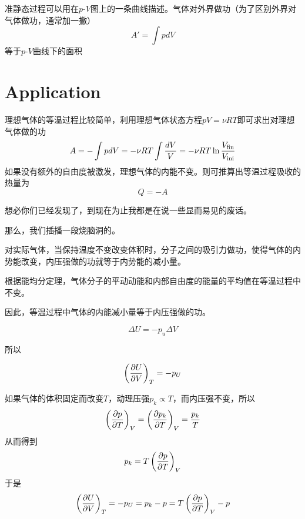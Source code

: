 \documentclass[CJK]{beamer}
\begin{document}
\begin{frame}
\bch
准静态过程可以用在$p$-$V$图上的一条曲线描述。气体对外界做功（为了区别外界对气体做功，通常加一撇）
$$ A' = \int p dV $$
等于$p$-$V$曲线下的面积

\ech
\end{frame}

\section{Application}

\begin{frame}
\bch
理想气体的等温过程比较简单，利用理想气体状态方程$pV = \nu RT$即可求出对理想气体做的功
$$ A = -\int p dV = -\nu R T \int \frac{dV}{V} =- \nu R T\ln\frac{V_{\rm fin}}{V_{\rm ini}}$$
如果没有额外的自由度被激发，理想气体的内能不变。则可推算出等温过程吸收的热量为
$$ Q = - A $$
\ech
\end{frame}

\begin{frame}
\bch

想必你们已经发现了，到现在为止我都是在说一些显而易见的废话\bye。

\ech
\end{frame}

\begin{frame}
\bch

那么，我们插播一段烧脑洞的。

\ech
\end{frame}


\begin{frame}
\bch
对实际气体，当保持温度不变改变体积时，分子之间的吸引力做功，使得气体的内势能改变，内压强做的功就等于内势能的减小量。

根据能均分定理，气体分子的平动动能和内部自由度的能量的平均值在等温过程中不变。

因此，等温过程中气体的内能减小量等于内压强做的功。

$$\Delta U = - p_u \Delta V$$

所以

$$\left(\frac{\partial U}{\partial V}\right)_{T} = - p_U  $$

\ech
\end{frame}

\begin{frame}
\bch
{\small
如果气体的体积固定而改变$T$，动理压强$p_k \propto T$，而内压强不变，所以
$$\left(\frac{\partial p}{\partial T}\right)_{V} = \left(\frac{\partial p_k}{\partial T}\right)_{V} = \frac{p_k}{T}$$
从而得到
$$p_k = T \left(\frac{\partial p}{\partial T}\right)_{V}$$
于是
$$\left(\frac{\partial U}{\partial V}\right)_{T} = -p_U = p_k - p = T \left(\frac{\partial p}{\partial T}\right)_{V} - p$$
}
\ech
\end{frame}
\end{document}
